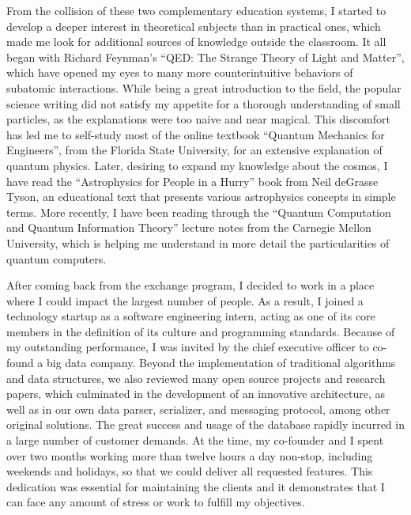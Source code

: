 \documentclass[10pt]{article}
\begin{document}
From the collision of these two complementary education systems, I started to develop a deeper interest in theoretical subjects than in practical ones, which made me look for additional sources of knowledge outside the classroom. It all began with Richard Feynman's ``QED: The Strange Theory of Light and Matter'', which have opened my eyes to many more counterintuitive behaviors of subatomic interactions. While being a great introduction to the field, the popular science writing did not satisfy my appetite for a thorough understanding of small particles, as the explanations were too naive and near magical. This discomfort has led me to self-study most of the online textbook ``Quantum Mechanics for Engineers'', from the Florida State University, for an extensive explanation of quantum physics. Later, desiring to expand my knowledge about the cosmos, I have read the ``Astrophysics for People in a Hurry'' book from Neil deGrasse Tyson, an educational text that presents various astrophysics concepts in simple terms. More recently, I have been reading through the ``Quantum Computation and Quantum Information Theory'' lecture notes from the Carnegie Mellon University, which is helping me understand in more detail the particularities of quantum computers.

After coming back from the exchange program, I decided to work in a place where I could impact the largest number of people. As a result, I joined a technology startup as a software engineering intern, acting as one of its core members in the definition of its culture and programming standards. Because of my outstanding performance, I was invited by the chief executive officer to co-found a big data company. Beyond the implementation of traditional algorithms and data structures, we also reviewed many open source projects and research papers, which culminated in the development of an innovative architecture, as well as in our own data parser, serializer, and messaging protocol, among other original solutions. The great success and usage of the database rapidly incurred in a large number of customer demands. At the time, my co-founder and I spent over two months working more than twelve hours a day non-stop, including weekends and holidays, so that we could deliver all requested features. This dedication was essential for maintaining the clients and it demonstrates that I can face any amount of stress or work to fulfill my objectives.
\end{document}
